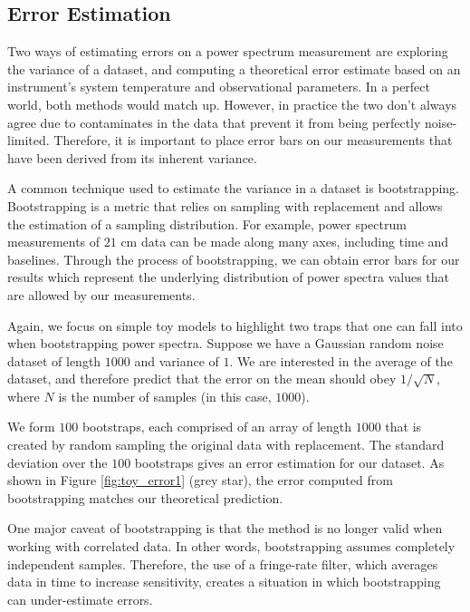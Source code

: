\documentclass[preprint2,numberedappendix,tighten,twocolappendix]{aastex6}  %
\begin{document}
\subsection{Error Estimation}
\label{sec:ErrorOverview}

Two ways of estimating errors on a power spectrum measurement are exploring the variance of a dataset, and computing a theoretical error estimate based on an instrument's system temperature and observational parameters. In a perfect world, both methods would match up. However, in practice the two don't always agree due to contaminates in the data that prevent it from being perfectly noise-limited. Therefore, it is important to place error bars on our measurements that have been derived from its inherent variance.

A common technique used to estimate the variance in a dataset is bootstrapping. Bootstrapping is a metric that relies on sampling with replacement and allows the estimation of a sampling distribution. For example, power spectrum measurements of $21$ cm data can be made along many axes, including time and baselines. Through the process of bootstrapping, we can obtain error bars for our results which represent the underlying distribution of power spectra values that are allowed by our measurements.

Again, we focus on simple toy models to highlight two traps that one can fall into when bootstrapping power spectra. Suppose we have a Gaussian random noise dataset of length $1000$ and variance of $1$. We are interested in the average of the dataset, and therefore predict that the error on the mean should obey $1/\sqrt{N}$, where $N$ is the number of samples (in this case, $1000$). 

We form $100$ bootstraps, each comprised of an array of length $1000$ that is created by random sampling the original data with replacement. The standard deviation over the $100$ bootstraps gives an error estimation for our dataset. As shown in Figure \ref{fig:toy_error1} (grey star), the error computed from bootstrapping matches our theoretical prediction.

One major caveat of bootstrapping is that the method is no longer valid when working with correlated data. In other words, bootstrapping assumes completely independent samples. Therefore, the use of a fringe-rate filter, which averages data in time to increase sensitivity, creates a situation in which bootstrapping can under-estimate errors.
\end{document}
